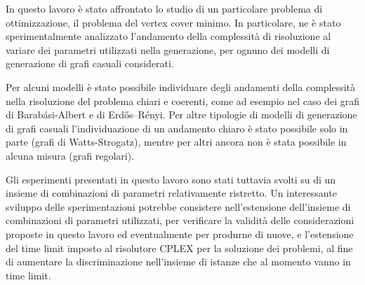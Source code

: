 In questo lavoro è stato affrontato lo studio di un particolare problema di ottimizzazione, il problema del vertex cover minimo. In particolare, ne è stato sperimentalmente analizzato l'andamento della complessità di risoluzione al variare dei parametri utilizzati nella generazione, per ognuno dei modelli di generazione di grafi casuali considerati.

Per alcuni modelli è stato possibile individuare degli andamenti della complessità nella risoluzione del problema chiari e coerenti, come ad esempio nel caso dei grafi di Barabási-Albert e di Erdős–Rényi. Per altre tipologie di modelli di generazione di grafi casuali l'individuazione di un andamento chiaro è stato possibile solo in parte (grafi di Watts-Strogatz), mentre per altri ancora non è stata possibile in alcuna misura (grafi regolari). 

Gli esperimenti presentati in questo lavoro sono stati tuttavia svolti su di un insieme di combinazioni di parametri relativamente ristretto. Un interessante sviluppo delle sperimentazioni potrebbe consistere nell'estensione dell'insieme di combinazioni di parametri utilizzati, per verificare la validità delle considerazioni proposte in questo lavoro ed eventualmente per produrne di nuove, e l'estensione del time limit imposto al risolutore CPLEX per la soluzione dei problemi, al fine di aumentare la discriminazione nell'insieme di istanze che al momento vanno in time limit. 
